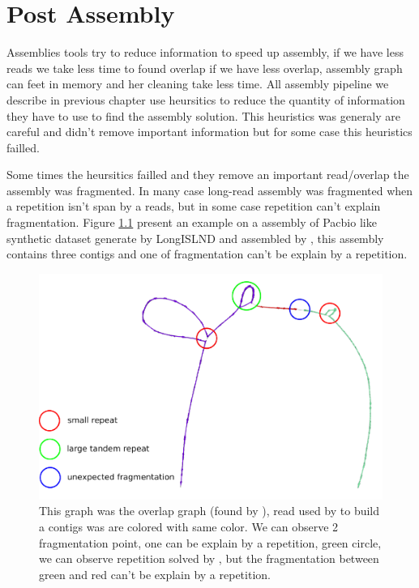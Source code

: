 \documentclass[main.tex]{subfiles}
\begin{document}
\chapter{Post Assembly} 

Assemblies tools try to reduce information to speed up assembly, if we have less reads we take less time to found overlap if we have less overlap, assembly graph can feet in memory and her cleaning take less time. All assembly pipeline we describe in previous chapter use heursitics to reduce the quantity of information they have to use to find the assembly solution. This heuristics was generaly are careful and didn't remove important information but for some case this heuristics failled.

Some times the heursitics failled and they remove an important read/overlap the assembly was fragmented. In many case long-read assembly was fragmented when a repetition isn't span by a reads, but in some case repetition can't explain fragmentation. Figure \ref{postassembly:fig:t_roseus_example} present an example on a assembly of Pacbio like synthetic dataset generate by LongISLND\cite{longislnd} and assembled by \canu, this assembly contains three contigs and one of fragmentation can't be explain by a repetition.

\begin{figure}[ht]
    \includegraphics[width=\textwidth]{postassembly/images/t_roseus_projection_annoted.pdf}
    \caption{This graph was the overlap graph (found by \minimap), read used by \canu to build a contigs was are colored with same color. We can observe 2 fragmentation point, one can be explain by a repetition, green circle, we can observe repetition solved by \canu, but the fragmentation between green and red can't be explain by a repetition.}
    \label{postassembly:fig:t_roseus_example}
\end{figure}
\end{document}
